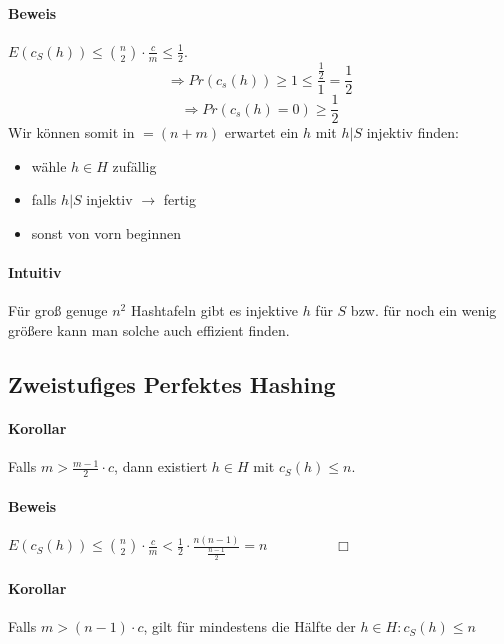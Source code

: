 \paragraph*{Beweis} $E(c_S(h)) \leq {n \choose 2} \cdot \frac{c}{m} \leq \frac{1}{2}$.
$$ \Rightarrow Pr(c_s(h)) \geq 1 \leq \frac{\frac{1}{2}}{1} = \frac{1}{2}$$
$$ \Rightarrow Pr(c_s(h)=0) \geq \frac{1}{2}$$
Wir können somit in $=(n+m)$ erwartet ein $h$ mit $h|S$ injektiv finden:
\begin{itemize}
	\item wähle $h \in H$ zufällig
	\item falls $h|S$ injektiv $\rightarrow$ fertig
	\item[] sonst von vorn beginnen
\end{itemize}

\paragraph*{Intuitiv} Für groß genuge $n^2$ Hashtafeln gibt es injektive $h$ für $S$ bzw. für noch ein wenig größere kann man solche auch effizient finden.



\subsection{Zweistufiges Perfektes Hashing}

\paragraph*{Korollar} Falls $m > \frac{m-1}{2} \cdot c$, dann existiert $h \in H$ mit $c_S(h) \leq n$.

\paragraph*{Beweis} $E(c_S(h)) \leq {n \choose 2} \cdot \frac{c}{m} < \frac{1}{2} \cdot \frac{n(n-1)}{\frac{n-1}{2}} = n \hspace{2cm} \Box$


\paragraph*{Korollar} Falls $m>(n-1)\cdot c$, gilt für mindestens die Hälfte der $h \in H : c_S(h) \leq n$

